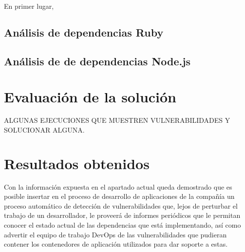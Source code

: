 En primer lugar, 

\subsection{Análisis de dependencias Ruby}

\subsection{Análisis de de dependencias Node.js}

\section{Evaluación de la solución}

ALGUNAS EJECUCIONES QUE MUESTREN VULNERABILIDADES Y SOLUCIONAR ALGUNA.

\section{Resultados obtenidos}

Con la información expuesta en el apartado actual queda demostrado que es posible insertar en el proceso de desarrollo de aplicaciones de la compañía un proceso automático de detección de vulnerabilidades que, lejos de perturbar el trabajo de un desarrollador, le proveerá de informes periódicos que le permitan conocer el estado actual de las dependencias que está implementando, así como advertir el equipo de trabajo DevOps de las vulnerabilidades que pudieran contener los contenedores de aplicación utilizados para dar soporte a estas.

\endinput
